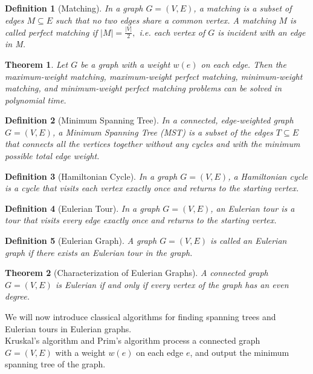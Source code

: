 \documentclass[12pt]{article}
\theoremstyle{remarkstyle}
\newtheorem{definition}{Definition}
\newtheorem{theorem}{Theorem}
\begin{document}
	\begin{definition}[Matching]
		In a graph \( G = (V, E) \), a \textit{matching} is a subset of edges \( M \subseteq E \) such that no two edges share a common vertex. A matching $M$ is called perfect matching if $\displaystyle \lvert M\rvert=\frac{\lvert V\rvert}{2},$ i.e. each vertex of $G$ is incident with an edge in M.
	\end{definition}
	
	\begin{theorem}
		Let $G$ be a graph with a weight $w(e)$ on each edge. Then the maximum-weight matching, maximum-weight perfect matching, minimum-weight matching, and minimum-weight perfect matching problems can be solved in polynomial time. 
	\end{theorem}
	
	\begin{definition}[Minimum Spanning Tree]
		In a connected, edge-weighted graph \( G = (V, E) \), a \textit{Minimum Spanning Tree (MST)} is a subset of the edges \( T \subseteq E \) that connects all the vertices together without any cycles and with the minimum possible total edge weight. 
	\end{definition}
	
	\begin{definition}[Hamiltonian Cycle]
		In a graph \( G = (V, E) \), a \textit{Hamiltonian cycle} is a cycle that visits each vertex exactly once and returns to the starting vertex. 
	\end{definition}
	
	
	\begin{definition}[Eulerian Tour]
		In a graph \( G = (V, E) \), an \textit{Eulerian tour} is a tour that visits every edge exactly once and returns to the starting vertex.
	\end{definition}
	
	\begin{definition}[Eulerian Graph]
		A graph \( G = (V, E) \) is called an \textit{Eulerian graph} if there exists an Eulerian tour in the graph. 
	\end{definition}
	
	\begin{theorem}[Characterization of Eulerian Graphs]
		A connected graph \( G = (V, E) \) is Eulerian if and only if every vertex of the graph has an even degree.
	\end{theorem}
	
We will now introduce classical algorithms for finding spanning trees and Eulerian tours in Eulerian graphs.\\
	Kruskal's algorithm and Prim's algorithm process a connected graph \( G = (V, E) \) with a weight \( w(e) \) on each edge \( e \), and output the minimum spanning tree of the graph.
	
\end{document}
